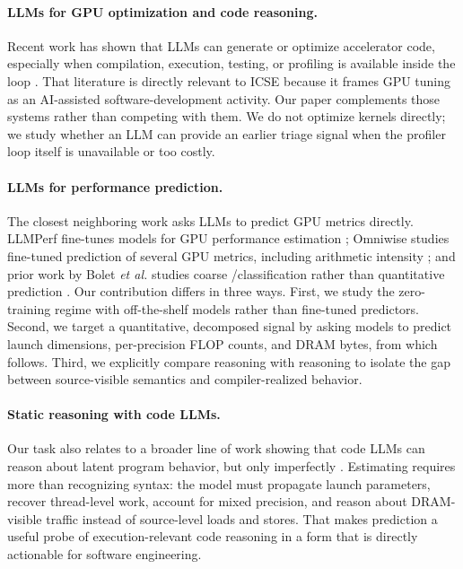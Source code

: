 \paragraph{LLMs for GPU optimization and code reasoning.}
Recent work has shown that LLMs can generate or optimize accelerator code, especially when compilation, execution, testing, or profiling is available inside the loop \cite{gongLanguageModelsCode2025,ouyangKernelBenchCanLLMs2025,chenCUDALLMLLMsCan2025,pengPerfCodeGenImprovingPerformance2025,zhangCudaForgeAgentFramework2025,kaplanParaCodexProfilingGuidedAutonomous2026}.
That literature is directly relevant to ICSE because it frames GPU tuning as an AI-assisted software-development activity.
Our paper complements those systems rather than competing with them.
We do not optimize kernels directly; we study whether an LLM can provide an earlier triage signal when the profiler loop itself is unavailable or too costly.

\paragraph{LLMs for performance prediction.}
The closest neighboring work asks LLMs to predict GPU metrics directly.
LLMPerf fine-tunes models for GPU performance estimation \cite{nguyen-nhatLLMPerfGPUPerformance2024}; Omniwise studies fine-tuned prediction of several GPU metrics, including arithmetic intensity \cite{wangOmniwisePredictingGPU2025}; and prior work by Bolet \textit{et al.} studies coarse \bandwidthbound/\computebound classification rather than quantitative \rai prediction \cite{boletCanLargeLanguage2025}.
Our contribution differs in three ways.
First, we study the zero-training regime with off-the-shelf models rather than fine-tuned predictors.
Second, we target a quantitative, decomposed signal by asking models to predict launch dimensions, per-precision FLOP counts, and DRAM bytes, from which \rai follows.
Third, we explicitly compare \sourceonly reasoning with \sourcesass reasoning to isolate the gap between source-visible semantics and compiler-realized behavior.

\paragraph{Static reasoning with code LLMs.}
Our task also relates to a broader line of work showing that code LLMs can reason about latent program behavior, but only imperfectly \cite{liuCodeExecutionPretrained2023,lyuLargeLanguageModels2024,jainLiveCodeBenchHolisticContamination2024,xieCOREBenchmarkingLLMs2025,pydaShortcomingsCodeLLMs2025}.
Estimating \rai requires more than recognizing syntax: the model must propagate launch parameters, recover thread-level work, account for mixed precision, and reason about DRAM-visible traffic instead of source-level loads and stores.
That makes \rai prediction a useful probe of execution-relevant code reasoning in a form that is directly actionable for software engineering.

